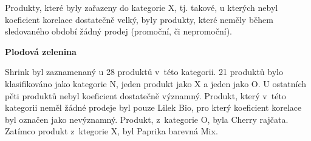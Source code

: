 Produkty, které byly zařazeny do kategorie X, tj. takové, u kterých nebyl koeficient korelace dostatečně velký, byly produkty, které neměly během sledovaného období žádný prodej (promoční, či nepromoční).




\textbf{Plodová zelenina}

Shrink byl zaznamenaný u 28 produktů v~této kategorii. 21 produktů bylo klasifikováno jako kategorie N, jeden produkt jako X a jeden jako O. U ostatních pěti produktů nebyl koeficient dostatečně významný. Produkt, který v~této kategorii neměl žádné prodeje byl pouze Lilek Bio, pro který koeficient korelace byl označen jako nevýznamný. Produkt, z~kategorie O, byla Cherry rajčata. Zatímco produkt z~ktegorie X, byl Paprika barevná Mix.


